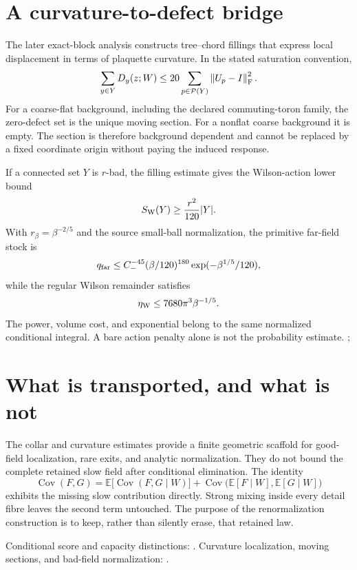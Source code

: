 \documentclass[11pt,oneside,openany]{book}
\theoremstyle{definition}
\theoremstyle{remark}
\newcommand{\E}{\mathbb E}
\newcommand{\Cov}{\operatorname{Cov}}
\newcommand{\norm}[1]{\left\lVert#1\right\rVert}
\newcommand{\src}[2]{\cite[#2]{#1}}
\newcommand{\sourcebasis}[1]{\par\smallskip\noindent #1\par}
\begin{document}
\section{A curvature-to-defect bridge}
The later exact-block analysis constructs tree--chord fillings that express local displacement in terms of plaquette curvature. In the stated saturation convention,
\begin{equation}\label{eq:filling}
\sum_{y\in Y}D_y(z;W)
\le20\sum_{p\in\mathcal P(Y)}\norm{U_p-I}_{\rm F}^2.
\end{equation}
For a coarse-flat background, including the declared commuting-toron family, the zero-defect set is the unique moving section. For a nonflat coarse background it is empty. The section is therefore background dependent and cannot be replaced by a fixed coordinate origin without paying the induced response.

If a connected set $Y$ is $r$-bad, the filling estimate gives the Wilson-action lower bound
\begin{equation}\label{eq:Peierls}
S_{\rm W}(Y)\ge\frac{r^2}{120}|Y|.
\end{equation}
With $r_\beta=\beta^{-2/5}$ and the source small-ball normalization, the primitive far-field stock is
\begin{equation}\label{eq:qfar}
q_{\rm far}\le C_-^{-45}(\beta/120)^{180}
\exp(-\beta^{1/5}/120),
\end{equation}
while the regular Wilson remainder satisfies
\begin{equation}\label{eq:etaW}
\eta_{\rm W}\le7680\pi^3\beta^{-1/5}.
\end{equation}
The power, volume cost, and exponential belong to the same normalized conditional integral. A bare action penalty alone is not the probability estimate. \src{F8}{curvature localization and final good--bad development}; \src{F9}{initial compact rebase}

\section{What is transported, and what is not}
The collar and curvature estimates provide a finite geometric scaffold for good-field localization, rare exits, and analytic normalization. They do not bound the complete retained slow field after conditional elimination. The identity
\begin{equation}\label{eq:totalcov}
\Cov(F,G)=\E\bigl[\Cov(F,G\mid W)\bigr]
+\Cov\bigl(\E[F\mid W],\E[G\mid W]\bigr)
\end{equation}
exhibits the missing slow contribution directly. Strong mixing inside every detail fibre leaves the second term untouched. The purpose of the renormalization construction is to keep, rather than silently erase, that retained law.
\sourcebasis{Conditional score and capacity distinctions: \cite{F6,F7}. Curvature localization, moving sections, and bad-field normalization: \cite{F8,F9}.}
\end{document}
